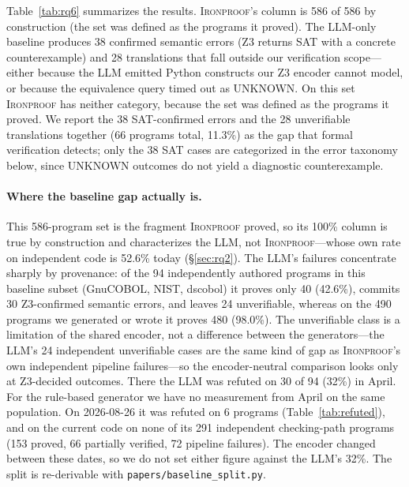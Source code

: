 \documentclass[sigconf,nonacm]{acmart}
\begin{document}
Table~\ref{tab:rq6} summarizes the results. \textsc{Ironproof}'s column is 586 of 586 by construction (the set was defined as the programs it proved). The LLM-only baseline produces 38 confirmed semantic errors (Z3 returns SAT with a concrete counterexample) and 28 translations that fall outside our verification scope---either because the LLM emitted Python constructs our Z3 encoder cannot model, or because the equivalence query timed out as UNKNOWN. On this set \textsc{Ironproof} has neither category, because the set was defined as the programs it proved. We report the 38 SAT-confirmed errors and the 28 unverifiable translations together (66 programs total, 11.3\%) as the gap that formal verification detects; only the 38 SAT cases are categorized in the error taxonomy below, since UNKNOWN outcomes do not yield a diagnostic counterexample.

\paragraph{Where the baseline gap actually is.} This 586-program set is the fragment \textsc{Ironproof} proved, so its 100\% column is true by construction and characterizes the LLM, not \textsc{Ironproof}---whose own rate on independent code is 52.6\% today (\S\ref{sec:rq2}). The LLM's failures concentrate sharply by provenance: of the 94 independently authored programs in this baseline subset (GnuCOBOL, NIST, dscobol) it proves only 40 (42.6\%), commits 30 Z3-confirmed semantic errors, and leaves 24 unverifiable, whereas on the 490 programs we generated or wrote it proves 480 (98.0\%). The unverifiable class is a limitation of the shared encoder, not a difference between the generators---the LLM's 24 independent unverifiable cases are the same kind of gap as \textsc{Ironproof}'s own independent pipeline failures---so the encoder-neutral comparison looks only at Z3-decided outcomes. There the LLM was refuted on 30 of 94 (32\%) in April. For the rule-based generator we have no measurement from April on the same population. On 2026-08-26 it was refuted on 6 programs (Table~\ref{tab:refuted}), and on the current code on none of its 291 independent checking-path programs (153 proved, 66 partially verified, 72 pipeline failures). The encoder changed between these dates, so we do not set either figure against the LLM's 32\%. The split is re-derivable with \texttt{papers/baseline\_split.py}.
\end{document}
